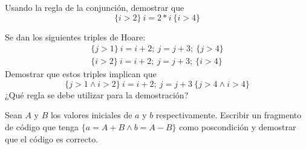 \begin{ejercicio}
    Usando la regla de la conjunción, demostrar que 
    \begin{equation*}
        \{i>2\}\ i=2\ast i\ \{i>4\}
    \end{equation*}
\end{ejercicio}

\begin{ejercicio}
    Se dan los siguientes triples de Hoare:
    \begin{gather*}
        \{j>1\}\ i=i+2;\ j=j+3;\ \{j>4\} \\
        \{i>2\}\ i=i+2;\ j=j+3;\ \{i>4\}
    \end{gather*}
    Demostrar que estos triples implican que
    \begin{equation*}
        \{j>1 \land i>2\}\ i=i+2;\ j=j+3\ \{j>4 \land i>4\}
    \end{equation*}
    ¿Qué regla se debe utilizar para la demostración?
\end{ejercicio}

\begin{ejercicio}
    Sean $A$ y $B$ los valores iniciales de $a$ y $b$ respectivamente. Escribir un fragmento de código que tenga $\{a=A+B \land b =A-B\}$ como poscondición y demostrar que el código es correcto.
\end{ejercicio}

